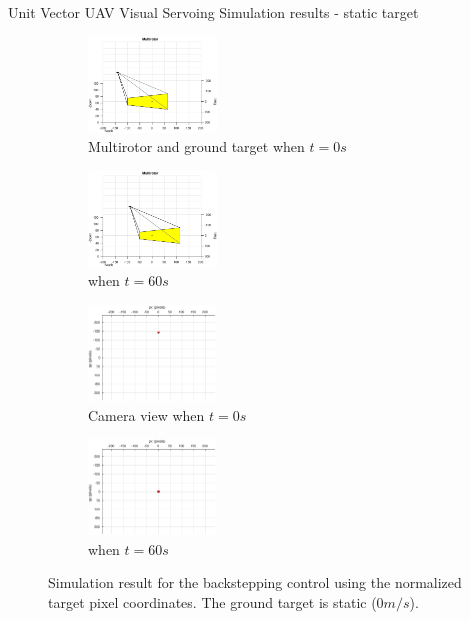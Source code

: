 \documentclass[9pt]{beamer}
\begin{document}
\begin{frame}{Unit Vector UAV Visual Servoing}
Simulation results - static target
\begin{figure}[htbp]
	\centering
	\begin{subfigure}[t]{0.45\linewidth}
		\centering
		\includegraphics[height=1.0in]{chapter4/image_UAV_0mps}
		\caption{Multirotor and ground target when $t=0s$}
	\end{subfigure}
	\begin{subfigure}[t]{0.45\linewidth}
		\centering
		\includegraphics[height=1.0in]{chapter4/image_UAV_0mps_60s}
		\caption{when $t=60s$}
	\end{subfigure}
	\begin{subfigure}[t]{0.45\linewidth}
		\centering
		\includegraphics[height=1.0in]{chapter4/image_camera_0mps}
		\caption{Camera view when $t=0s$}
	\end{subfigure}
	\begin{subfigure}[t]{0.45\linewidth}
		\centering
		\includegraphics[height=1.0in]{chapter4/image_camera_0mps_60s}
		\caption{when $t=60s$}
	\end{subfigure}
	\caption{Simulation result for the backstepping control using the normalized target pixel coordinates. The ground target is static ($0m/s$).}
	\label{image_0mps}
\end{figure}
\end{frame}
\end{document}
